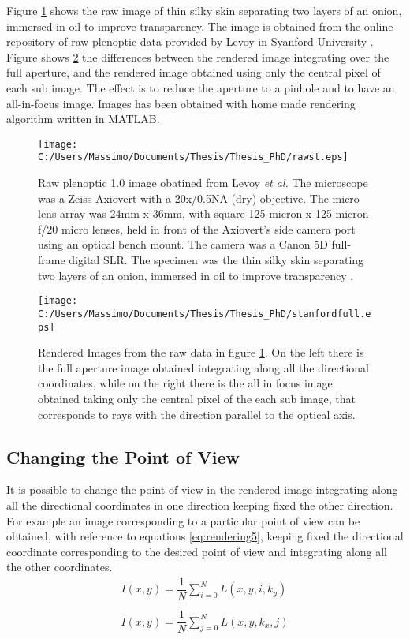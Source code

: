Figure \ref{fig:rawstanford1} shows the raw image of thin silky skin separating two layers of an onion, immersed in oil to improve transparency. The image is obtained from the online repository of raw plenoptic data provided by Levoy in Syanford University \cite{levoy2006microscope}. 
 Figure shows \ref{fig:stanford1} the differences between the rendered image integrating over the full aperture, and the rendered image obtained using only the central pixel of each sub image. The effect is to reduce the aperture to a pinhole and to have an all-in-focus image.
 Images has been obtained with home made rendering algorithm written in MATLAB.
 \begin{figure}[H]
 	\centering
 	\texttt{[image: C:/Users/Massimo/Documents/Thesis/Thesis\_PhD/rawst.eps]}
 	\caption{\label{fig:rawstanford1} Raw plenoptic 1.0 image obatined from Levoy \textit{et al.} The microscope was a Zeiss Axiovert with a 20x/0.5NA (dry) objective. The micro lens array was 24mm x 36mm, with square 125-micron x 125-micron f/20 micro lenses, held in front of the Axiovert's side camera port using an optical bench mount. The camera was a Canon 5D full-frame digital SLR. The specimen was the thin silky skin separating two layers of an onion, immersed in oil to improve transparency \cite{levoy2006microscope}. }
 \end{figure}
\begin{figure}[H]
	\centering
	\texttt{[image: C:/Users/Massimo/Documents/Thesis/Thesis\_PhD/stanfordfull.eps]}
	\caption{\label{fig:stanford1}Rendered Images from the raw data in figure \ref{fig:rawstanford1}. On the left there is the full aperture image obtained integrating along all the directional coordinates, while on the right there is the all in focus image obtained taking only the central pixel of the each sub image, that corresponds to rays with the direction parallel to the optical axis.}
\end{figure}
 \subsection{Changing the Point of View}
It is possible to change the point of view in the rendered image integrating along all the directional coordinates in one direction keeping fixed the other direction. For example an image corresponding to a particular point of view can be obtained, with reference to equations \ref{eq:rendering5}, keeping fixed the directional coordinate corresponding to the desired point of view and integrating along all the other coordinates. 
 \begin{equation}
 \label{eq:rendering5}
 \begin{matrix}
 I(x,y)=\dfrac{1}{N}\sum_{i=0}^{N} L(x,y,i,k_y) \\
 \\
 I(x,y)=\dfrac{1}{N}\sum_{j=0}^{N} L(x,y,k_x,j)
 \end{matrix} 
 \end{equation}
